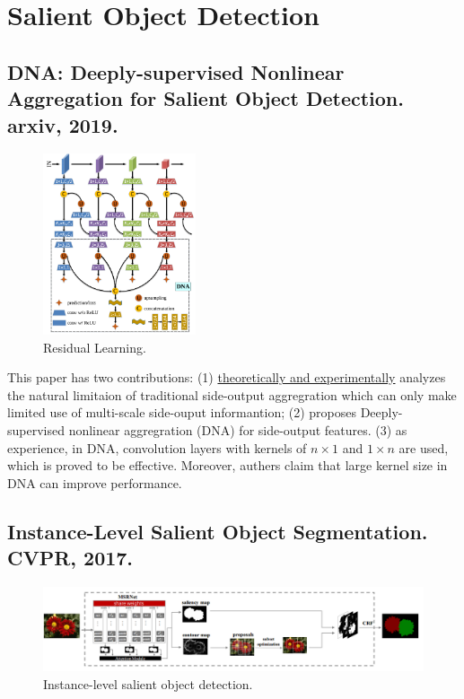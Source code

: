 \documentclass[10pt,onecolumn]{book}
\begin{document}
\chapter{Salient Object Detection}
\section{DNA: Deeply-supervised Nonlinear Aggregation for Salient Object Detection. arxiv, 2019.}
\begin{figure}[h]
\centering
\includegraphics[width=0.4\textwidth]{figures_paper_reading/DNA_Deeply-supervised_Nonlinear_Aggregation_for_Salient_Object_Detection.png}
\caption{Residual Learning.}
\end{figure}

This paper has two contributions: 
(1) \uline{theoretically and experimentally} analyzes the natural limitaion of traditional side-output aggregration which can only make limited use of multi-scale side-ouput informantion; 
(2) proposes Deeply-supervised nonlinear aggregration (DNA) for side-output features. 
(3) as experience, in DNA, convolution layers with kernels of $n \times 1$ and $1 \times n$ are used, which is proved to be effective. Moreover, authers claim that large kernel size in DNA can improve performance.

\section{Instance-Level Salient Object Segmentation. CVPR, 2017.}
\begin{figure}[h]
\centering
\includegraphics[width=1\textwidth]{figures_paper_reading/instance-SOD.png}
\caption{Instance-level salient object detection.}
\end{figure}
\end{document}
